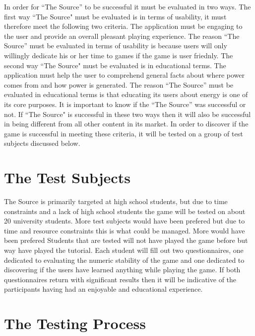 \documentclass[msc,oneside]{ubcthesis}%
\begin{document}
  In order for “The Source” to be successful it must be evaluated in two ways. The first way ``The Source" must be evaluated is in terms of usability, it must therefore meet the following two criteria. The application must be engaging to the user and provide an overall pleasant playing experience. The reason ``The Source'' must be evaluated in terms of usability is because users will only willingly dedicate his or her time to games if the game is user friednly. The second way ``The Source" must be evaluated is in educational terms. The application must help the user to comprehend general facts about where power comes from and how power is generated. The reason ``The Source'' must be evaluated in educational terms is that educating its users about energy is one of its core purposes. It is important to know if the ``The Source'' was successful or not. If ``The Source" is successful in these two ways then it will also be successful in being different from all other content in its market. In order to discover if the game is successful in meeting these criteria, it will be tested on a group of test subjects discussed below.

  \section{The Test Subjects}
      The Source is primarily targeted at high school students, but due to time constraints and a lack of high school students the game will be tested on about 20 university students. More test subjects would have been prefered but due to time and resource constraints this is what could be managed. More would have been prefered  Students that are tested will not have played the game before but way have played the tutorial. Each student will fill out two questionnaires, one dedicated to evaluating the numeric stability of the game and one dedicated to discovering if the users have learned anything while playing the game. If both questionnaires return with significant results then it will be indicative of the participants having had an enjoyable and educational experience. 

  \section{The Testing Process}
\end{document}
